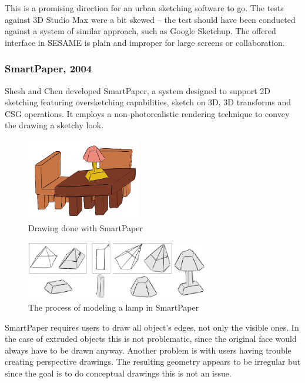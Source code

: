 This is a promising direction for an urban sketching software to go.
The tests against 3D Studio Max were a bit skewed -- the test should
have been conducted against a system of similar approach, such as Google Sketchup.
The offered interface in SESAME is plain and improper for large screens or collaboration.


\subsubsection{SmartPaper, 2004}

Shesh and Chen \cite{SMARTPAPER} developed SmartPaper, a system designed to support
2D sketching featuring oversketching capabilities, sketch on 3D, 3D transforms and
CSG operations. It employs a non-photorealistic rendering technique to convey the
drawing a sketchy look.

\begin{figure}[!ht]
	\centering
	\includegraphics[width=5cm]{gfx/smartpaper.png}
	\caption{Drawing done with SmartPaper}
	\label{FIG-SMARTPAPER}
\end{figure}

\begin{figure}[!ht]
	\centering
	\includegraphics[width=8cm]{gfx/smartpaper2.png}
	\caption{The process of modeling a lamp in SmartPaper}
	\label{FIG-SMARTPAPER2}
\end{figure}


SmartPaper requires users to draw all object's edges, not only the visible ones.
In the case of extruded objects this is not problematic, since the original face would always have to be drawn anyway.
Another problem is with users having trouble creating perspective drawings.
The resulting geometry appears to be irregular but since the goal is to do
conceptual drawings this is not an issue.

